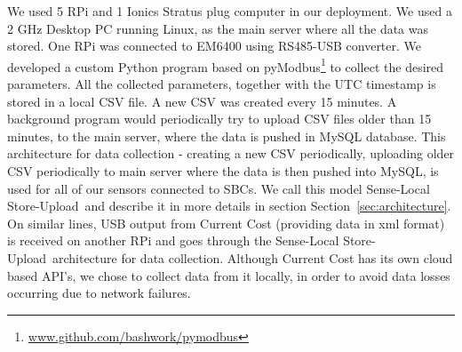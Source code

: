 \documentclass[10pt]{sensys-proc}
\newcommand{\secref}[1]{Section~\ref{#1}}
\newcommand{\tabref}[1]{Table~\ref{#1}}
\newcommand{\paradigms}{Sense-Local Store-Upload~}
\begin{document}
We used 5 RPi and 1 Ionics Stratus plug computer in our deployment. We used a 2 GHz Desktop PC running Linux, as the main server where all the data was stored. %
One RPi was connected to EM6400 using RS485-USB converter. We developed a custom Python program based on pyModbus\footnote{\url{www.github.com/bashwork/pymodbus}} to collect the desired parameters. %
All the collected parameters, together with the UTC timestamp is stored in a local CSV file. A new CSV was created every 15 minutes. A background program would periodically try to upload CSV files older than 15 minutes, to the main server, where the data is pushed in MySQL database. This architecture for data collection - creating a new CSV periodically, uploading older CSV periodically to main server where the data is then pushed into MySQL, is used for all of our sensors connected to SBCs. We call this model \paradigms and describe it in more details in section \secref{sec:architecture}. On similar lines, USB output from Current Cost (providing data in xml format) is received on another RPi and goes through the \paradigms architecture for data collection. %
Although Current Cost has its own cloud based API's, we chose to collect data from it locally, in order to avoid data losses occurring due to network failures. 

\end{document}
